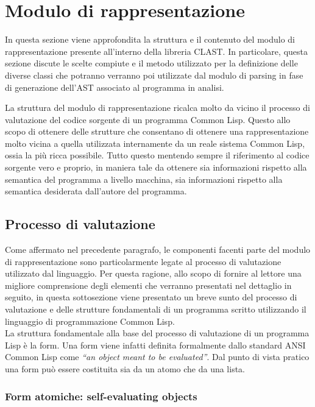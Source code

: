\section{Modulo di rappresentazione}

In questa sezione viene approfondita la struttura e il contenuto del modulo di
rappresentazione presente all'interno della libreria CLAST. In particolare,
questa sezione discute le scelte compiute e il metodo utilizzato per la
definizione delle diverse classi che potranno verranno poi utilizzate dal
modulo di parsing in fase di generazione dell'AST associato al programma in
analisi.

La struttura del modulo di rappresentazione ricalca molto da vicino il
processo di valutazione del codice sorgente di un programma Common Lisp.
Questo allo scopo di ottenere delle strutture che consentano di ottenere una
rappresentazione molto vicina a quella utilizzata internamente da un reale
sistema Common Lisp, ossia la più ricca possibile. Tutto questo mentendo
sempre il riferimento al codice sorgente vero e proprio, in maniera tale da
ottenere sia informazioni rispetto alla semantica del programma a livello
macchina, sia informazioni rispetto alla semantica desiderata dall’autore del
programma.

\subsection{Processo di valutazione}

Come affermato nel precedente paragrafo, le componenti facenti parte del
modulo di rappresentazione sono particolarmente legate al processo di
valutazione utilizzato dal linguaggio. Per questa ragione, allo scopo di
fornire al lettore una migliore comprensione degli elementi che verranno
presentati nel dettaglio in seguito, in questa sottosezione viene presentato
un breve sunto del processo di valutazione e delle strutture fondamentali di
un programma scritto utilizzando il linguaggio di programmazione Common
Lisp.\\

La struttura fondamentale alla base del processo di valutazione di un
programma Lisp è la form. Una form viene infatti definita formalmente dallo
standard ANSI Common Lisp come \textit{“an object meant to be evaluated”}. Dal
punto di vista pratico una form può essere costituita sia da un atomo che da
una lista.

\subsubsection{Form atomiche: self-evaluating objects}

